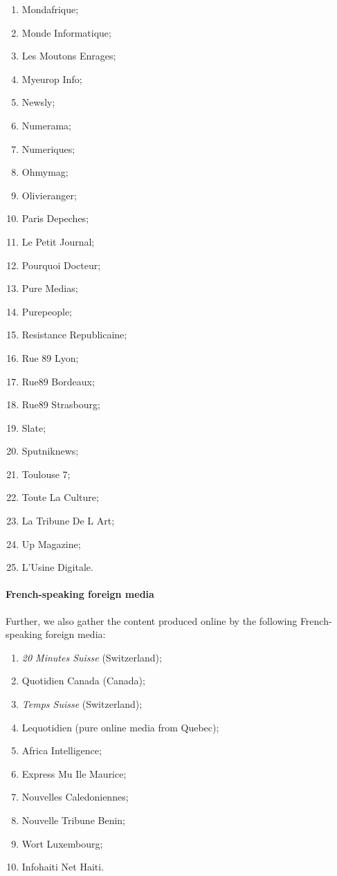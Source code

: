 \begin{multicols}{2}
\begin{enumerate}
	\item Mondafrique;
	\item Monde Informatique;
	\item Les Moutons Enrages;
	\item Myeurop Info;
	\item Newsly;
	\item Numerama;
	\item Numeriques;
	\item Ohmymag;
	\item Olivieranger;
	\item Paris Depeches;
	\item Le Petit Journal;
	\item Pourquoi Docteur;
	\item Pure Medias;
	\item Purepeople;
	\item Resistance Republicaine;
	\item Rue 89 Lyon;
	\item Rue89 Bordeaux;
	\item Rue89 Strasbourg;
	\item Slate;
	\item Sputniknews;
	\item Toulouse 7;
	\item Toute La Culture;
	\item La Tribune De L Art;
	\item Up Magazine;
	\item L'Usine Digitale.
	\end{enumerate}			
\end{multicols}


\paragraph{French-speaking foreign media}

Further, we also gather the content produced online by the following French-speaking foreign media:
\begin{enumerate}
\item \textit{20 Minutes Suisse} (Switzerland);
\item Quotidien Canada (Canada);
\item \textit{Temps Suisse} (Switzerland);
\item Lequotidien (pure online media from Quebec);
\item Africa Intelligence;
\item Express Mu Ile Maurice;
\item Nouvelles Caledoniennes;
\item Nouvelle Tribune Benin;
\item Wort Luxembourg;
\item Infohaiti Net Haiti.
\end{enumerate}


